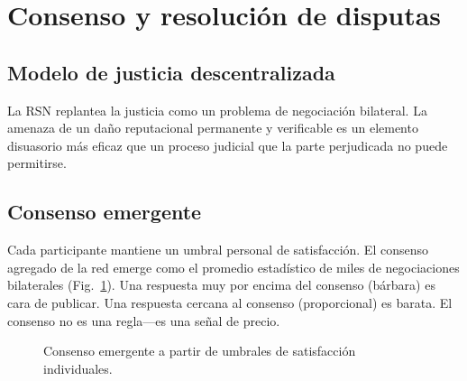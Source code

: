 \documentclass[11pt,a4paper,twocolumn]{article}
\begin{document}
\section{Consenso y resolución de disputas}

\subsection{Modelo de justicia descentralizada}

La RSN replantea la justicia como un problema de negociación bilateral. La amenaza de un daño reputacional permanente y verificable es un elemento disuasorio más eficaz que un proceso judicial que la parte perjudicada no puede permitirse.

\subsection{Consenso emergente}

Cada participante mantiene un umbral personal de satisfacción. El consenso agregado de la red emerge como el promedio estadístico de miles de negociaciones bilaterales (Fig.~\ref{fig:consensus}). Una respuesta muy por encima del consenso (bárbara) es cara de publicar. Una respuesta cercana al consenso (proporcional) es barata. El consenso no es una regla---es una señal de precio.

\begin{figure}[ht]
\centering
{}
\caption{Consenso emergente a partir de umbrales de satisfacción individuales.}
\label{fig:consensus}
\end{figure}
\end{document}

